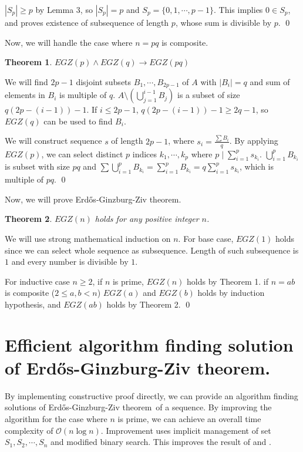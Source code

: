\documentclass[11pt]{article}
\newtheorem{theorem}{Theorem}
\newcommand{\EGZT}{Erd\H{o}s-Ginzburg-Ziv theorem}
\begin{document}
$|S_p| \ge p$ by Lemma 3, so $|S_p| = p$ and $S_p = \{0, 1, \cdots, p-1\}$. This implies $0 \in S_p$, and proves existence of subsequence of length $p$, whose sum is divisible by $p$. \qed

\vspace{\baselineskip}


Now, we will handle the case where $n=pq$ is composite.

\begin{theorem}
$EGZ(p) \wedge EGZ(q) \rightarrow EGZ(pq)$
\end{theorem}

We will find $2p-1$ disjoint subsets $B_1, \cdots, B_{2p-1}$ of $A$ with $|B_i| = q$ and sum of elements in $B_i$ is multiple of $q$. $A \setminus (\bigcup_{j=1}^{i-1} B_{j})$ is a subset of size $q(2p-(i-1))-1$. If $i \le 2p-1$, $q(2p-(i-1))-1 \ge 2q-1$, so $EGZ(q)$ can be used to find $B_i$.

We will construct sequence $s$ of length $2p-1$, where $s_i = \frac{\sum B_i}{q}$. By applying $EGZ(p)$, we can select distinct $p$ indices $k_1, \cdots, k_p$ where $p \mid \sum_{i=1}^{p} s_{k_i}$. $\bigcup_{i=1}^{p} B_{k_i}$ is subset with size $pq$ and $\sum \bigcup_{i=1}^{p} B_{k_i} = \sum_{i=1}^{p} B_{k_i} = q \sum_{i=1}^{p} s_{k_i}$, which is multiple of $pq$. \qed

\vspace{\baselineskip}

Now, we will prove \EGZT .

\begin{theorem}
$EGZ(n)$ holds for any positive integer $n$.
\end{theorem}

We will use strong mathematical induction on $n$. For base case, $EGZ(1)$ holds since we can select whole sequence as subsequence. Length of such subsequence is $1$ and every number is divisible by $1$.

For inductive case $n \ge 2$, if $n$ is prime, $EGZ(n)$ holds by Theorem 1. if $n = ab$ is composite ($2 \le a, b < n$) $EGZ(a)$ and $EGZ(b)$ holds by induction hypothesis, and $EGZ(ab)$ holds by Theorem 2. \qed

\section{Efficient algorithm finding solution of \EGZT.}

By implementing constructive proof directly, we can provide an algorithm finding solutions of \EGZT\ of a sequence. By improving the algorithm for the case where $n$ is prime, we can achieve an overall time complexity of $\mathcal{O}(n \log n)$. Improvement uses implicit management of set $S_{1}, S_{2}, \cdots, S_{n}$ and modified binary search. This improves the result of \cite{2DELLUNGO20092658} and \cite{doi:10.1137/1.9781611976496.5}. 
\end{document}
